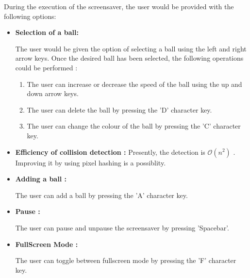 \documentclass[]{article}
\begin{document}
\begin{flushleft} 

During the execution of the screensaver, the user would be provided with the following options:

\begin{itemize}

\item \textbf{Selection of a ball:}

The user would be given the option of selecting a ball using the left and right arrow keys. Once the desired ball has been selected, the following operations could be performed :

\begin{enumerate}


\item The user can increase or decrease the speed of the ball using the up and down arrow keys. 


\item The user can delete the ball by pressing the 'D' character key. 

\item The user can change the colour of the ball by pressing the 'C' character key.

\end{enumerate}

\item \textbf{Efficiency of collision detection :} Presently, the detection is $\mathcal{O}(n^2)$ . Improving it by using pixel hashing is a possiblity.

\item \textbf{Adding a ball :}

The user can add a ball by pressing the 'A' character key.

\item\textbf{Pause :}

The user can pause and unpause the screensaver by pressing 'Spacebar'.


\item \textbf{FullScreen Mode :}

The user can toggle between fullscreen mode by pressing the 'F' character key.


\end{itemize}

\end{flushleft}
\end{document}
